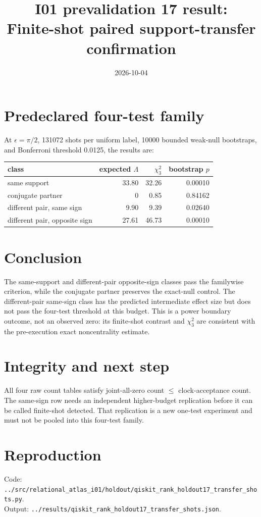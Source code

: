 \documentclass[11pt]{article}
\begin{document}
\title{I01 prevalidation 17 result:\\Finite-shot paired support-transfer confirmation}
\date{2026-10-04}
\maketitle

\section*{Predeclared four-test family}
At $\epsilon=\pi/2$, 131072 shots per uniform label, 10000 bounded weak-null
bootstraps, and Bonferroni threshold 0.0125, the results are:
\begin{center}
\begin{tabular}{lrrr}
\toprule
class & expected $\Lambda$ & $\chi^2_3$ & bootstrap $p$\\
\midrule
same support & 33.80 & 32.26 & 0.00010\\
conjugate partner & 0 & 0.85 & 0.84162\\
different pair, same sign & 9.90 & 9.39 & 0.02640\\
different pair, opposite sign & 27.61 & 46.73 & 0.00010\\
\bottomrule
\end{tabular}
\end{center}

\section*{Conclusion}
The same-support and different-pair opposite-sign classes pass the familywise
criterion, while the conjugate partner preserves the exact-null control. The
different-pair same-sign class has the predicted intermediate effect size but does
not pass the four-test threshold at this budget. This is a power boundary outcome,
not an observed zero: its finite-shot contrast and $\chi^2_3$ are consistent with
the pre-execution exact noncentrality estimate.

\section*{Integrity and next step}
All four raw count tables satisfy joint-all-zero count $\leq$ clock-acceptance count.
The same-sign row needs an independent higher-budget replication before it can be
called finite-shot detected. That replication is a new one-test experiment and must
not be pooled into this four-test family.

\section*{Reproduction}
Code: \texttt{../src/relational\_atlas\_i01/holdout/qiskit\_rank\_holdout17\_transfer\_shots.py}.\\
Output: \texttt{../results/qiskit\_rank\_holdout17\_transfer\_shots.json}.
\end{document}
